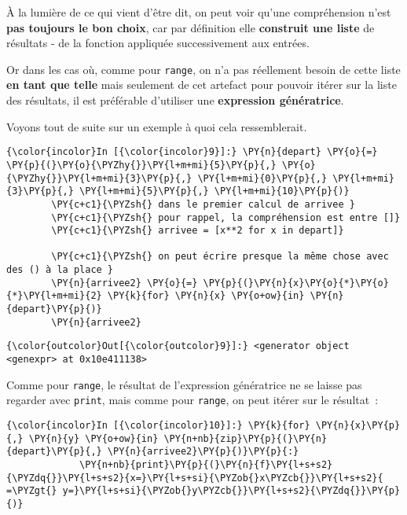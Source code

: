    À la lumière de ce qui vient d'être dit, on peut voir qu'une
compréhension n'est \textbf{pas toujours le bon choix}, car par
définition elle \textbf{construit une liste} de résultats - de la
fonction appliquée successivement aux entrées.

Or dans les cas où, comme pour \texttt{range}, on n'a pas réellement
besoin de cette liste \textbf{en tant que telle} mais seulement de cet
artefact pour pouvoir itérer sur la liste des résultats, il est
préférable d'utiliser une \textbf{expression génératrice}.

Voyons tout de suite sur un exemple à quoi cela ressemblerait.

    \begin{Verbatim}[commandchars=\\\{\},frame=single,framerule=0.3mm,rulecolor=\color{cellframecolor}]
{\color{incolor}In [{\color{incolor}9}]:} \PY{n}{depart} \PY{o}{=} \PY{p}{(}\PY{o}{\PYZhy{}}\PY{l+m+mi}{5}\PY{p}{,} \PY{o}{\PYZhy{}}\PY{l+m+mi}{3}\PY{p}{,} \PY{l+m+mi}{0}\PY{p}{,} \PY{l+m+mi}{3}\PY{p}{,} \PY{l+m+mi}{5}\PY{p}{,} \PY{l+m+mi}{10}\PY{p}{)}
        \PY{c+c1}{\PYZsh{} dans le premier calcul de arrivee }
        \PY{c+c1}{\PYZsh{} pour rappel, la compréhension est entre []}
        \PY{c+c1}{\PYZsh{} arrivee = [x**2 for x in depart]}
        
        \PY{c+c1}{\PYZsh{} on peut écrire presque la même chose avec des () à la place }
        \PY{n}{arrivee2} \PY{o}{=} \PY{p}{(}\PY{n}{x}\PY{o}{*}\PY{o}{*}\PY{l+m+mi}{2} \PY{k}{for} \PY{n}{x} \PY{o+ow}{in} \PY{n}{depart}\PY{p}{)}
        \PY{n}{arrivee2}
\end{Verbatim}


\begin{Verbatim}[commandchars=\\\{\},frame=single,framerule=0.3mm,rulecolor=\color{cellframecolor}]
{\color{outcolor}Out[{\color{outcolor}9}]:} <generator object <genexpr> at 0x10e411138>
\end{Verbatim}
            
    Comme pour \texttt{range}, le résultat de l'expression génératrice ne se
laisse pas regarder avec \texttt{print}, mais comme pour \texttt{range},
on peut itérer sur le résultat~:

    \begin{Verbatim}[commandchars=\\\{\},frame=single,framerule=0.3mm,rulecolor=\color{cellframecolor}]
{\color{incolor}In [{\color{incolor}10}]:} \PY{k}{for} \PY{n}{x}\PY{p}{,} \PY{n}{y} \PY{o+ow}{in} \PY{n+nb}{zip}\PY{p}{(}\PY{n}{depart}\PY{p}{,} \PY{n}{arrivee2}\PY{p}{)}\PY{p}{:}
             \PY{n+nb}{print}\PY{p}{(}\PY{n}{f}\PY{l+s+s2}{\PYZdq{}}\PY{l+s+s2}{x=}\PY{l+s+si}{\PYZob{}x\PYZcb{}}\PY{l+s+s2}{ =\PYZgt{} y=}\PY{l+s+si}{\PYZob{}y\PYZcb{}}\PY{l+s+s2}{\PYZdq{}}\PY{p}{)}
\end{Verbatim}


